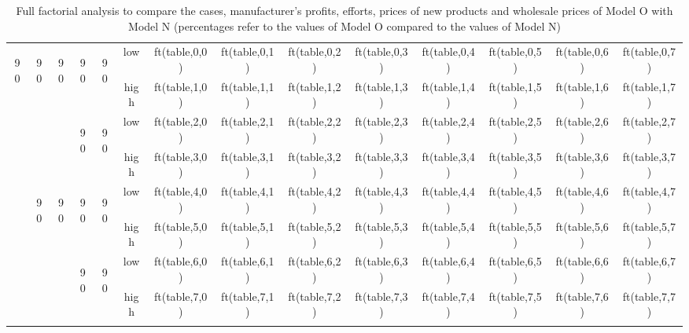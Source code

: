 \documentclass[a4paper,10pt]{article}
\newcommand\tabrotate[1]{\begin{turn}{90}\rlap{{'{#'}}1}\end{turn}}
\begin{document}
\begin{table}[htp]
\begin{center}
\begin{small}
\begin{tabular}{cccccc|cccccccc}
    {%
        {%
           \hline
            \multicolumn{6}{c}{{'{' + table_name + '}' }}\\
            \hline
      \multirow{8}{*}{\tabrotate{s}} &\multirow{4}{*}{\tabrotate{low}} &\multirow{4}{*}{\tabrotate{$c_r$}}&\multirow{2}{*}{\tabrotate{low}}&\multirow{2}{*}{\tabrotate{a}}&low&{{ft(table,0,0)}}&{{ft(table,0,1)}}&{{ft(table,0,2)}}&{{ft(table,0,3)}}&{{ft(table,0,4)}}&{{ft(table,0,5)}}&{{ft(table,0,6)}}&{{ft(table,0,7)}}\\
      & &&&&high&{{ft(table,1,0)}}&{{ft(table,1,1)}}&{{ft(table,1,2)}}&{{ft(table,1,3)}}&{{ft(table,1,4)}}&{{ft(table,1,5)}}&{{ft(table,1,6)}}&{{ft(table,1,7)}}\\
    &&&\multirow{2}{*}{\tabrotate{high}}&\multirow{2}{*}{\tabrotate{a}}&low&{{ft(table,2,0)}}&{{ft(table,2,1)}}&{{ft(table,2,2)}}&{{ft(table,2,3)}}&{{ft(table,2,4)}}&{{ft(table,2,5)}}&{{ft(table,2,6)}}&{{ft(table,2,7)}}\\
    &&&&&high&{{ft(table,3,0)}}&{{ft(table,3,1)}}&{{ft(table,3,2)}}&{{ft(table,3,3)}}&{{ft(table,3,4)}}&{{ft(table,3,5)}}&{{ft(table,3,6)}}&{{ft(table,3,7)}}\\
    &\multirow{4}{*}{\tabrotate{high}}&\multirow{4}{*}{\tabrotate{$c_r$}}&\multirow{2}{*}{\tabrotate{low}}&\multirow{2}{*}{\tabrotate{a}}&low&{{ft(table,4,0)}}&{{ft(table,4,1)}}&{{ft(table,4,2)}}&{{ft(table,4,3)}}&{{ft(table,4,4)}}&{{ft(table,4,5)}}&{{ft(table,4,6)}}&{{ft(table,4,7)}}\\
    &&&&&high&{{ft(table,5,0)}}&{{ft(table,5,1)}}&{{ft(table,5,2)}}&{{ft(table,5,3)}}&{{ft(table,5,4)}}&{{ft(table,5,5)}}&{{ft(table,5,6)}}&{{ft(table,5,7)}}\\
    &&&\multirow{2}{*}{\tabrotate{high}}&\multirow{2}{*}{\tabrotate{a}}&low&{{ft(table,6,0)}}&{{ft(table,6,1)}}&{{ft(table,6,2)}}&{{ft(table,6,3)}}&{{ft(table,6,4)}}&{{ft(table,6,5)}}&{{ft(table,6,6)}}&{{ft(table,6,7)}}\\
    &&&&&high&{{ft(table,7,0)}}&{{ft(table,7,1)}}&{{ft(table,7,2)}}&{{ft(table,7,3)}}&{{ft(table,7,4)}}&{{ft(table,7,5)}}&{{ft(table,7,6)}}&{{ft(table,7,7)}}\\
    {%
    \end{tabular}
      \caption{Full factorial analysis to compare the cases, manufacturer's profits, efforts, prices of new products and wholesale prices of Model O with Model N (percentages refer to the values of Model O compared to the values of Model N)}
      \label{full_factorial}
      \end{small}
    \end{center}
    \end{table}
\end{document}
